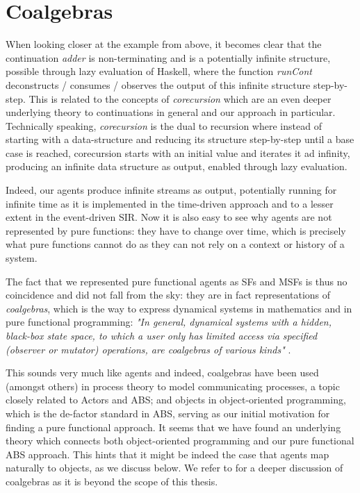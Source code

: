 \section{Coalgebras}
When looking closer at the example from above, it becomes clear that the continuation \textit{adder} is non-terminating and is a potentially infinite structure, possible through lazy evaluation of Haskell, where the function \textit{runCont} deconstructs / consumes / observes the output of this infinite structure step-by-step. This is related to the concepts of \textit{corecursion} which are an even deeper underlying theory to continuations in general and our approach in particular. Technically speaking, \textit{corecursion} is the dual to recursion where instead of starting with a data-structure and reducing its structure step-by-step until a base case is reached, corecursion starts with an initial value and iterates it ad infinity, producing an infinite data structure as output, enabled through lazy evaluation.

Indeed, our agents produce infinite streams as output, potentially running for infinite time as it is implemented in the time-driven approach and to a lesser extent in the event-driven SIR. Now it is also easy to see why agents are not represented by pure functions: they have to change over time, which is precisely what pure functions cannot do as they can not rely on a context or history of a system.

The fact that we represented pure functional agents as SFs and MSFs is thus no coincidence and did not fall from the sky: they are in fact representations of \textit{coalgebras}, which is the way to express dynamical systems in mathematics and in pure functional programming: \textit{"In general, dynamical systems with a hidden, black-box state space, to which a user only has limited access via specified (observer or mutator) operations, are coalgebras of various kinds"} \cite{jacobs_tutorial_1997}.

This sounds very much like agents and indeed, coalgebras have been used (amongst others) in process theory to model communicating processes, a topic closely related to Actors and ABS; and objects in object-oriented programming, which is the de-factor standard in ABS, serving as our initial motivation for finding a pure functional approach. It seems that we have found an underlying theory which connects both object-oriented programming and our pure functional ABS approach. This hints that it might be indeed the case that agents map naturally to objects, as we discuss below. We refer to \cite{jacobs_tutorial_1997, jacobs_introduction_2017} for a deeper discussion of coalgebras as it is beyond the scope of this thesis.

